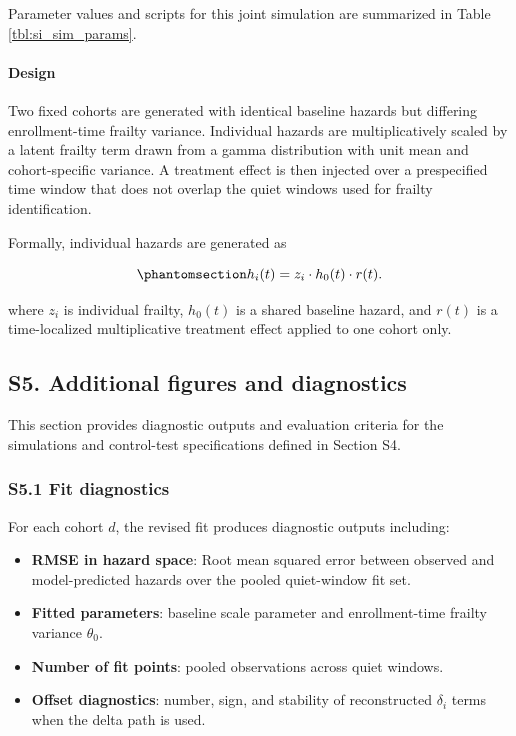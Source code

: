 \documentclass[
]{article}
\providecommand{\tightlist}{%
  \setlength{\itemsep}{0pt}\setlength{\parskip}{0pt}}
\begin{document}
Parameter values and scripts for this joint simulation are summarized in
Table \ref{tbl:si_sim_params}.

\paragraph{Design}\label{design}

Two fixed cohorts are generated with identical baseline hazards but
differing enrollment-time frailty variance. Individual hazards are
multiplicatively scaled by a latent frailty term drawn from a gamma
distribution with unit mean and cohort-specific variance. A treatment
effect is then injected over a prespecified time window that does not
overlap the quiet windows used for frailty identification.

Formally, individual hazards are generated as

\begin{equation}\protect\phantomsection\label{eq:si_individual_hazard_with_effect}{
h_i(t) = z_i \cdot h_0(t) \cdot r(t).
}\end{equation}

where \(z_i\) is individual frailty, \(h_0(t)\) is a shared baseline
hazard, and \(r(t)\) is a time-localized multiplicative treatment effect
applied to one cohort only.

\subsection{S5. Additional figures and
diagnostics}\label{s5.-additional-figures-and-diagnostics}

This section provides diagnostic outputs and evaluation criteria for the
simulations and control-test specifications defined in Section S4.

\subsubsection{S5.1 Fit diagnostics}\label{s5.1-fit-diagnostics}

For each cohort \(d\), the revised fit produces diagnostic outputs
including:

\begin{itemize}
\tightlist
\item
  \textbf{RMSE in hazard space}: Root mean squared error between
  observed and model-predicted hazards over the pooled quiet-window fit
  set.
\item
  \textbf{Fitted parameters}: baseline scale parameter and
  enrollment-time frailty variance \(\theta_0\).
\item
  \textbf{Number of fit points}: pooled observations across quiet
  windows.
\item
  \textbf{Offset diagnostics}: number, sign, and stability of
  reconstructed \(\delta_i\) terms when the delta path is used.
\end{itemize}
\end{document}
